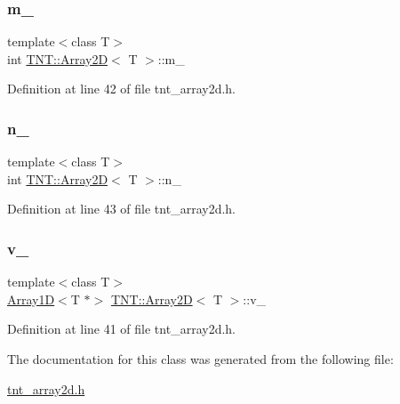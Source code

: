 \subsubsection{\texorpdfstring{m\+\_\+}{m\_}}
{\footnotesize\ttfamily template$<$class T$>$ \\
int \hyperlink{classTNT_1_1Array2D}{T\+N\+T\+::\+Array2D}$<$ T $>$\+::m\+\_\+\hspace{0.3cm}{\ttfamily [private]}}



Definition at line 42 of file tnt\+\_\+array2d.\+h.

\mbox{\label{classTNT_1_1Array2D_a4a182694802765bdb358f9737ab922b1}} 
\subsubsection{\texorpdfstring{n\+\_\+}{n\_}}
{\footnotesize\ttfamily template$<$class T$>$ \\
int \hyperlink{classTNT_1_1Array2D}{T\+N\+T\+::\+Array2D}$<$ T $>$\+::n\+\_\+\hspace{0.3cm}{\ttfamily [private]}}



Definition at line 43 of file tnt\+\_\+array2d.\+h.

\mbox{\label{classTNT_1_1Array2D_a7752a958a6c55bd094ce2c987aa78546}} 
\subsubsection{\texorpdfstring{v\+\_\+}{v\_}}
{\footnotesize\ttfamily template$<$class T$>$ \\
\hyperlink{classTNT_1_1Array1D}{Array1D}$<$T $\ast$$>$ \hyperlink{classTNT_1_1Array2D}{T\+N\+T\+::\+Array2D}$<$ T $>$\+::v\+\_\+\hspace{0.3cm}{\ttfamily [private]}}



Definition at line 41 of file tnt\+\_\+array2d.\+h.



The documentation for this class was generated from the following file\+:\begin{DoxyCompactItemize}
\item 
\hyperlink{tnt__array2d_8h}{tnt\+\_\+array2d.\+h}\end{DoxyCompactItemize}
